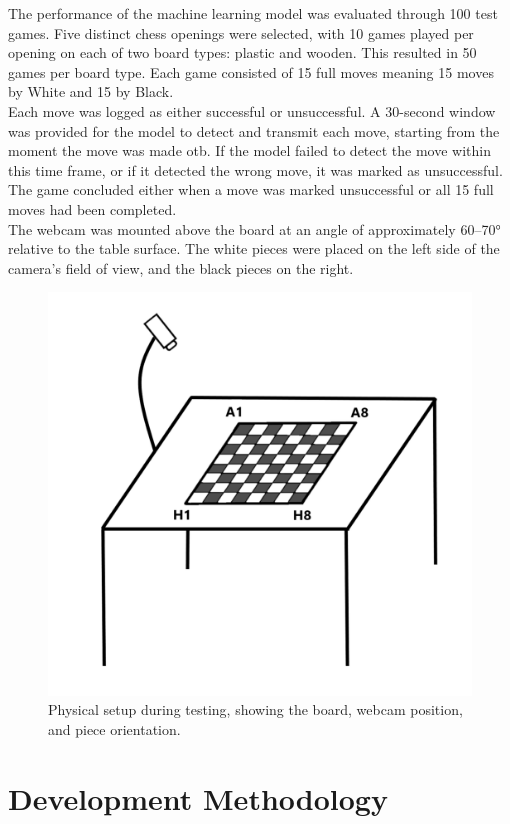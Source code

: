 The performance of the machine learning model was evaluated through 100 test games. Five distinct chess openings were selected, with 10 games played per opening on each of two board types: plastic and wooden. This resulted in 50 games per board type. Each game consisted of 15 full moves meaning 15 moves by White and 15 by Black. \\

Each move was logged as either successful or unsuccessful. A 30-second window was provided for the model to detect and transmit each move, starting from the moment the move was made \gls{otb}. If the model failed to detect the move within this time frame, or if it detected the wrong move, it was marked as unsuccessful. The game concluded either when a move was marked unsuccessful or all 15 full moves had been completed. \\

The webcam was mounted above the board at an angle of approximately 60–70\si{\degree}
 relative to the table surface. The white pieces were placed on the left side of the camera's field of view, and the black pieces on the right.

\begin{figure}[h!]
    \centering
    \includegraphics[width=0.75\linewidth]{figures/methods/testing/setup.png}
    \caption[Setup during testing]{Physical setup during testing, showing the board, webcam position, and piece orientation.}
    \label{fig:setup}
\end{figure}




\section{Development Methodology}
\label{sec:development-methodology}

